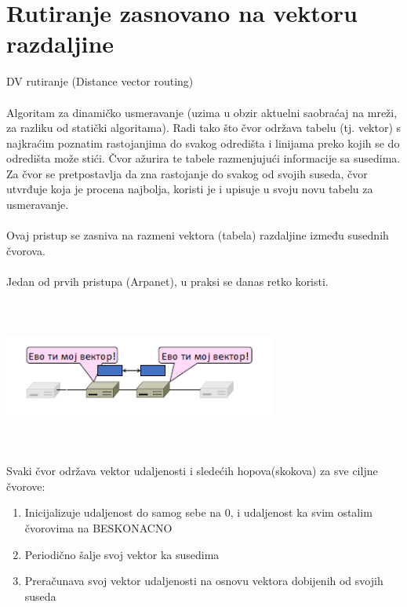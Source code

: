 \documentclass{article} %
\begin{document}
\section{Rutiranje zasnovano na vektoru razdaljine}
DV rutiranje (Distance vector routing)\\
\\
Algoritam za dinamičko usmeravanje (uzima u obzir aktuelni saobraćaj na mreži, za razliku od statički algoritama). Radi tako što čvor održava tabelu (tj. vektor) s najkraćim poznatim rastojanjima do svakog odredišta i linijama preko kojih se do odredišta može stići. Čvor ažurira te tabele razmenjujući informacije sa susedima. Za čvor se pretpostavlja da zna rastojanje do svakog od svojih suseda, čvor utvrđuje koja je procena najbolja, koristi je i upisuje u svoju novu tabelu za usmeravanje.\\
\\
Ovaj pristup se zasniva na razmeni vektora (tabela) razdaljine između susednih čvorova.\\
\\
Jedan od prvih pristupa (Arpanet), u praksi se danas retko koristi.
\begin{center}
		\includegraphics[width=9cm, height=5cm]{dv}\\
\end{center}
Svaki čvor održava vektor udaljenosti i sledećih hopova(skokova) za sve ciljne čvorove:
\begin{enumerate}
	\item Inicijalizuje udaljenost do samog sebe na 0, i udaljenost ka svim ostalim čvorovima na BESKONACNO
	\item Periodično šalje svoj vektor ka susedima
	\item Preračunava svoj vektor udaljenosti na osnovu vektora dobijenih od svojih suseda
\end{enumerate}
\end{document}
